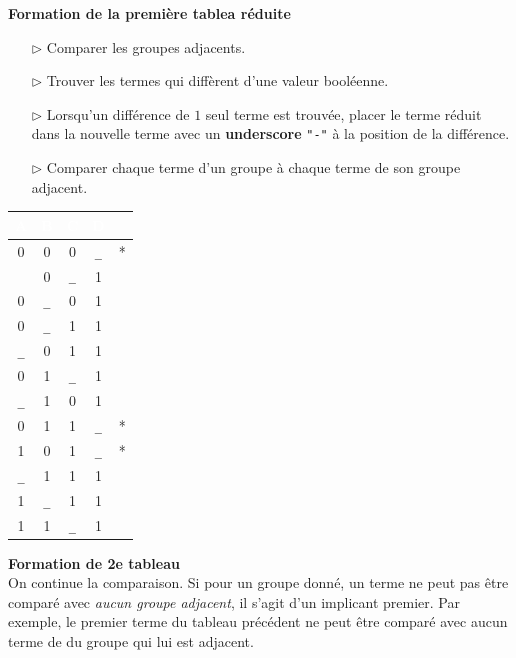 \documentclass{report}
\begin{document}
\begin{multicols*}{3}
  \textbf{Formation de la première tablea réduite}  
  \begin{itemize}
    \item [$\rhd$ ] Comparer les groupes adjacents. 
    \item [$\rhd$ ] Trouver les termes qui diffèrent d'une valeur booléenne. 
    \item [$\rhd$ ] Lorsqu'un différence de $1$ seul terme est trouvée, 
      placer le terme réduit dans la nouvelle terme avec un \textbf{underscore} 
      \texttt{"-"} à la position de la différence.    
    \item [$\rhd$ ] Comparer chaque terme d'un groupe à chaque terme de 
      son groupe adjacent. 
  \end{itemize}


      \begin{center}
          \begin{tabular}{c c c c c}
          \rowcolor{myg}
          \textcolor{white}{A} & \textcolor{white}{B} & \textcolor{white}{C} & \textcolor{white}{D} & \\
          \hline  
          0 & 0 & 0 & \texttt{\_}  & * \\
          \arrayrulecolor{red}
          \hline
          0 & 0 & \texttt{\_}   & 1 & \\
          0 & \texttt{\_} & 0  & 1 & \\
          \hline
          0 & \texttt{\_}   & 1 & 1 & \\
          \texttt{\_}   & 0 & 1 & 1 & \\
          0 & 1 & \texttt{\_}   & 1 & \\
          \texttt{\_}   & 1 & 0 & 1 & \\
          0 & 1 & 1 & \texttt{\_}  & * \\
          1 & 0 & 1 & \texttt{\_}   & * \\
          \hline
          \texttt{\_}   & 1 & 1 & 1 & \\ 
          1 & \texttt{\_}   & 1 & 1 & \\ 
          1 & 1 & \texttt{\_}   & 1 & \\ 
          \end{tabular}  
      \end{center} 

      
      \noindent \textbf{Formation de 2e tableau} \\ 
      On continue la comparaison. Si pour un groupe donné, un terme ne peut pas 
      être comparé avec \textit{aucun groupe adjacent}, il s'agit d'un implicant premier. 
      Par exemple, le premier terme du tableau précédent ne peut être comparé 
      avec aucun terme de du groupe qui lui est adjacent. 



\end{multicols*}
\end{document}
